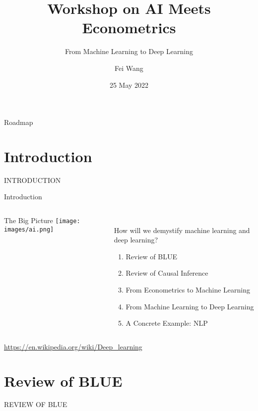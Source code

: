 \documentclass[aspectratio=169, t]{beamer}
\title[Workshop on AI Meets Econometrics]{Workshop on AI Meets Econometrics}
\subtitle{From Machine Learning to Deep Learning}
\author{Fei Wang}
\institute[Goethe University Frankfurt]{Management and Microeconomics \\
 Goethe Universität Frankfurt}
\date{25 May 2022}
\begin{document}
\frame[noframenumbering]{\titlepage}

\begin{frame}{Roadmap}
    \tableofcontents
\end{frame}

\section{Introduction}


\begin{frame}{}
    \vspace{90pt}
    \begin{center}
        \huge INTRODUCTION 
    \end{center}
\end{frame}

\begin{frame}{Introduction}
    \begin{columns}
        \begin{column}{0.45\textwidth}
            The Big Picture
            \texttt{[image: images/ai.png]}
        \end{column}
        \begin{column}{0.45\textwidth}
            \vspace{5mm} \\ 
            How will we demystify machine learning and deep learning?
            \begin{enumerate}
                \item Review of BLUE 
                \item Review of Causal Inference
                \item From Econometrics to Machine Learning
                \item From Machine Learning to Deep Learning
                \item A Concrete Example: NLP
            \end{enumerate}
        \end{column}
    \end{columns}
    \footnotesize{
            \url{https://en.wikipedia.org/wiki/Deep_learning}
            }
\end{frame}


\section{Review of BLUE}


\begin{frame}{}
    \vspace{90pt}
    \begin{center}
        \huge REVIEW OF BLUE
    \end{center}
\end{frame}
\end{document}
